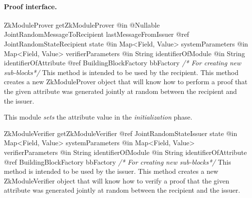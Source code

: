       \paragraph{Proof interface.}
      \begin{method}
      {ZkModuleProver}
      {getZkModuleProver}
      {
        {@in @Nullable JointRandomMessageToRecipient lastMessageFromIssuer}
        {@ref JointRandomStateRecipient state}
        {@in Map<Field, Value> systemParameters}
        {@in Map<Field, Value> verifierParameters}
        {@in String identifierOfModule}
        {@in String identifierOfAttribute}
        {@ref BuildingBlockFactory bbFactory \textrm{\emph{/* For creating new sub-blocks*/}}}
      }
      This method is intended to be used by the recipient.
      This method creates a new ZkModuleProver object that will know how to
      perform a proof that the given attribute was generated jointly at random
      between the recipient and the issuer.

      This module \emph{sets} the attribute value in the \emph{initialization} phase.
      \end{method}
      \begin{method}
      {ZkModuleVerifier}
      {getZkModuleVerifier}
      {
        {@ref JointRandomStateIssuer state}
        {@in Map<Field, Value> systemParameters}
        {@in Map<Field, Value> verifierParameters}
        {@in String identifierOfModule}
        {@in String identifierOfAttribute}
        {@ref BuildingBlockFactory bbFactory \textrm{\emph{/* For creating new sub-blocks*/}}}
      }
      This method is intended to be used by the issuer.
      This method creates a new ZkModuleVerifier object that will know how to
      verify a proof that the given attribute was generated jointly at random
      between the recipient and the issuer.
      \end{method}

